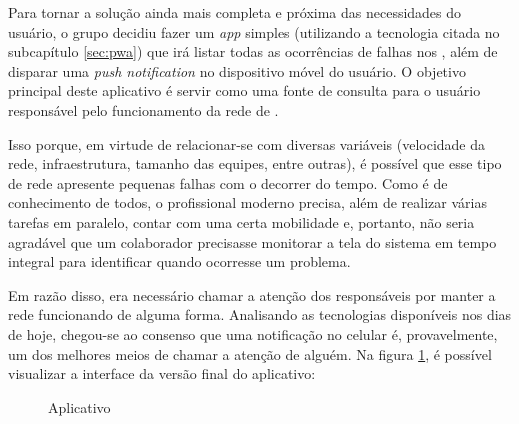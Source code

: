 Para tornar a solução ainda mais completa e próxima das necessidades do usuário, o grupo decidiu fazer um \textit{app} simples (utilizando a tecnologia citada no subcapítulo \ref{sec:pwa}) que irá listar todas as ocorrências de falhas nos \containers{}, além de disparar uma \textit{push notification} no dispositivo móvel do usuário. O objetivo principal deste aplicativo é servir como uma fonte de consulta para o usuário responsável pelo funcionamento da rede de \containers{}.

Isso porque, em virtude de relacionar-se com diversas variáveis (velocidade da rede, infraestrutura, tamanho das equipes, entre outras), é possível que esse tipo de rede apresente pequenas falhas com o decorrer do tempo. Como é de conhecimento de todos, o profissional moderno precisa, além de realizar várias tarefas em paralelo, contar com uma certa mobilidade e, portanto, não seria agradável que um colaborador precisasse monitorar a tela do sistema em tempo integral para identificar quando ocorresse um problema.

Em razão disso, era necessário chamar a atenção dos responsáveis por manter a rede funcionando de alguma forma. Analisando as tecnologias disponíveis nos dias de hoje, chegou-se ao consenso que uma notificação no celular é, provavelmente, um dos melhores meios de chamar a atenção de alguém. Na figura \ref{fig:aplicativo}, é possível visualizar a interface da versão final do aplicativo:

\begin{figure}[!htb]
    \centering
    \caption{Aplicativo}
    \label{fig:aplicativo}
\end{figure}


